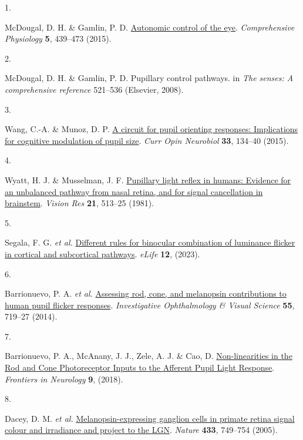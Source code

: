 \documentclass[
]{article}
\newlength{\cslhangindent}
\newlength{\csllabelwidth}
\newenvironment{CSLReferences}[2] %
 {\begin{list}{}{%
  \setlength{\itemindent}{0pt}
  \setlength{\leftmargin}{0pt}
  \setlength{\parsep}{0pt}
  \ifodd #1
   \setlength{\leftmargin}{\cslhangindent}
   \setlength{\itemindent}{-1\cslhangindent}
  \fi
  \setlength{\itemsep}{#2\baselineskip}}}
 {\end{list}}
\newcommand{\CSLLeftMargin}[1]{\parbox[t]{\csllabelwidth}{\strut#1\strut}}
\newcommand{\CSLRightInline}[1]{\parbox[t]{\linewidth - \csllabelwidth}{\strut#1\strut}}
\begin{document}
\label{refs}
\begin{CSLReferences}{0}{0}
\CSLLeftMargin{1. }%
\CSLRightInline{McDougal, D. H. \& Gamlin, P. D. \href{https://doi.org/10.1002/cphy.c140014}{Autonomic control of the eye}. \emph{Comprehensive Physiology} \textbf{5}, 439--473 (2015).}

\CSLLeftMargin{2. }%
\CSLRightInline{McDougal, D. H. \& Gamlin, P. D. Pupillary control pathways. in \emph{The senses: A comprehensive reference} 521--536 (Elsevier, 2008).}

\CSLLeftMargin{3. }%
\CSLRightInline{Wang, C.-A. \& Munoz, D. P. \href{https://doi.org/10.1016/j.conb.2015.03.018}{A circuit for pupil orienting responses: Implications for cognitive modulation of pupil size}. \emph{Curr Opin Neurobiol} \textbf{33}, 134--40 (2015).}

\CSLLeftMargin{4. }%
\CSLRightInline{Wyatt, H. J. \& Musselman, J. F. \href{https://doi.org/10.1016/0042-6989(81)90097-3}{Pupillary light reflex in humans: Evidence for an unbalanced pathway from nasal retina, and for signal cancellation in brainstem}. \emph{Vision Res} \textbf{21}, 513--25 (1981).}

\CSLLeftMargin{5. }%
\CSLRightInline{Segala, F. G. \emph{et al.} \href{https://doi.org/10.7554/elife.87048}{Different rules for binocular combination of luminance flicker in cortical and subcortical pathways}. \emph{eLife} \textbf{12}, (2023).}

\CSLLeftMargin{6. }%
\CSLRightInline{Barrionuevo, P. A. \emph{et al.} \href{https://doi.org/10.1167/iovs.13-13252}{Assessing rod, cone, and melanopsin contributions to human pupil flicker responses}. \emph{Investigative Ophthalmology \& Visual Science} \textbf{55}, 719--27 (2014).}

\CSLLeftMargin{7. }%
\CSLRightInline{Barrionuevo, P. A., McAnany, J. J., Zele, A. J. \& Cao, D. \href{https://doi.org/10.3389/fneur.2018.01140}{Non-linearities in the {Rod} and {Cone} {Photoreceptor} {Inputs} to the {Afferent} {Pupil} {Light} {Response}}. \emph{Frontiers in Neurology} \textbf{9}, (2018).}

\CSLLeftMargin{8. }%
\CSLRightInline{Dacey, D. M. \emph{et al.} \href{https://doi.org/10.1038/nature03387}{Melanopsin-expressing ganglion cells in primate retina signal colour and irradiance and project to the {LGN}}. \emph{Nature} \textbf{433}, 749--754 (2005).}


\end{CSLReferences}
\end{document}
